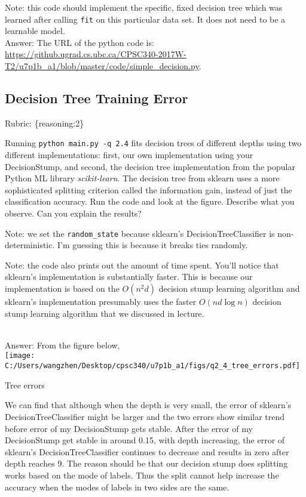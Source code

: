 \documentclass{article}
\def\blu#1{{\color{blu}#1}}
\def\gre#1{{\color{gre}#1}}
\def\rubric#1{\gre{Rubric: \{#1\}}}{}
\begin{document}
Note: this code should implement the specific, fixed decision tree
which was learned after calling \texttt{fit} on this particular data set. It does not need to be a learnable model.
\textcolor{gre}{
\\Answer: The URL of the python code is: \url{https://github.ugrad.cs.ubc.ca/CPSC340-2017W-T2/u7p1b_a1/blob/master/code/simple_decision.py}.}

\subsection{Decision Tree Training Error}
\rubric{reasoning:2}

Running \texttt{python main.py -q 2.4} fits decision trees of different depths using two different implementations: first,
our own implementation using your DecisionStump, and second, the decision tree implementation from the popular Python ML library \emph{scikit-learn}.
The decision tree from sklearn uses a more sophisticated splitting criterion called the information gain, instead of just the classification accuracy.
Run the code and look at the figure.
\blu{Describe what you observe. Can you explain the results?}

Note: we set the \verb|random_state| because sklearn's DecisionTreeClassifier is non-deterministic. I'm guessing this is
because it breaks ties randomly.

Note: the code also prints out the amount of time spent. You'll notice that sklearn's implementation is substantially faster. This is because
our implementation is based on the $O(n^2d)$ decision stump learning algorithm and sklearn's implementation presumably uses the faster $O(nd\log n)$
decision stump learning algorithm that we discussed in lecture.
\textcolor{gre}{
\\Answer:
From the figure below,\\ 
\texttt{[image: C:/Users/wangzhen/Desktop/cpsc340/u7p1b\_a1/figs/q2\_4\_tree\_errors.pdf]}
\caption{Tree errors}
We can find that although when the depth is very small, the error of sklearn's DecisionTreeClassifier might be larger and the two errors show similar trend before error of my DecisionStump gets stable. After the error of my DecisionStump get stable in around 0.15, with depth increasing, the error of sklearn's DecisionTreeClassifier continues to decrease and results in zero after depth reaches 9.
The reason should be that our decision stump does splitting works based on the mode of labels. Thus the split cannot help increase the accuracy when the
modes of labels in two sides are the same.
}
\end{document}
